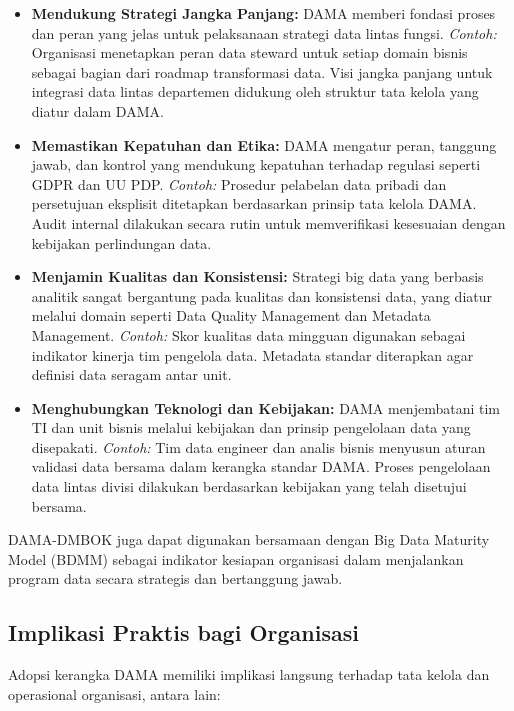 \begin{itemize}
	\item \textbf{Mendukung Strategi Jangka Panjang:} DAMA memberi fondasi proses dan peran yang jelas untuk pelaksanaan strategi data lintas fungsi. \textit{Contoh:}  Organisasi menetapkan peran data steward untuk setiap domain bisnis sebagai bagian dari roadmap transformasi data. Visi jangka panjang untuk integrasi data lintas departemen didukung oleh struktur tata kelola yang diatur dalam DAMA.
	
	\item \textbf{Memastikan Kepatuhan dan Etika:} DAMA mengatur peran, tanggung jawab, dan kontrol yang mendukung kepatuhan terhadap regulasi seperti GDPR dan UU PDP. \textit{Contoh:}  Prosedur pelabelan data pribadi dan persetujuan eksplisit ditetapkan berdasarkan prinsip tata kelola DAMA. Audit internal dilakukan secara rutin untuk memverifikasi kesesuaian dengan kebijakan perlindungan data.
	
	\item \textbf{Menjamin Kualitas dan Konsistensi:} Strategi big data yang berbasis analitik sangat bergantung pada kualitas dan konsistensi data, yang diatur melalui domain seperti Data Quality Management dan Metadata Management. \textit{Contoh:}  Skor kualitas data mingguan digunakan sebagai indikator kinerja tim pengelola data. Metadata standar diterapkan agar definisi data seragam antar unit.
	
	\item \textbf{Menghubungkan Teknologi dan Kebijakan:} DAMA menjembatani tim TI dan unit bisnis melalui kebijakan dan prinsip pengelolaan data yang disepakati. \textit{Contoh:}  Tim data engineer dan analis bisnis menyusun aturan validasi data bersama dalam kerangka standar DAMA. Proses pengelolaan data lintas divisi dilakukan berdasarkan kebijakan yang telah disetujui bersama.
\end{itemize}


DAMA-DMBOK juga dapat digunakan bersamaan dengan Big Data Maturity Model (BDMM) sebagai indikator kesiapan organisasi dalam menjalankan program data secara strategis dan bertanggung jawab.

\subsection{Implikasi Praktis bagi Organisasi}

Adopsi kerangka DAMA memiliki implikasi langsung terhadap tata kelola dan operasional organisasi, antara lain:

